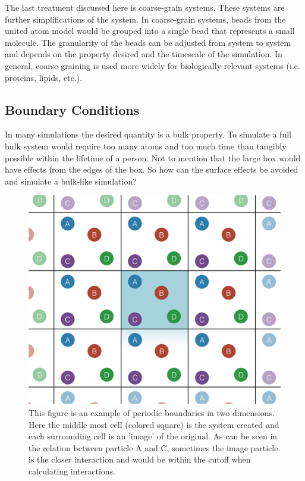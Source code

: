 The last treatment discussed here is coarse-grain systems. These systems are further simplifications of the system. In coarse-grain systems, beads from the united atom model would be grouped into a single bead that represents a small molecule. The granularity of the beads can be adjusted from system to system and depends on the property desired and the timescale of the simulation. In general, coarse-graining is used more widely for biologically relevant systems (i.e. proteins, lipids, etc.).
    
\subsection{Boundary Conditions}
In many simulations the desired quantity is a bulk property. To simulate a full bulk system would require too many atoms and too much time than tangibly possible within the lifetime of a person. Not to mention that the large box would have effects from the edges of the box. So how can the surface effects be avoided and simulate a bulk-like simulation?

\begin{figure}
    \includegraphics[scale=0.5]{figures/pbc-center.pdf}
    \caption{This figure is an example of periodic boundaries in two dimensions. Here the middle most cell (colored square) is the system created and each surrounding cell is an 'image' of the original. As can be seen in the relation between particle A and C, sometimes the image particle is the closer interaction and would be within the cutoff when calculating interactions.}
    \label{fig:pbc}
\end{figure}

